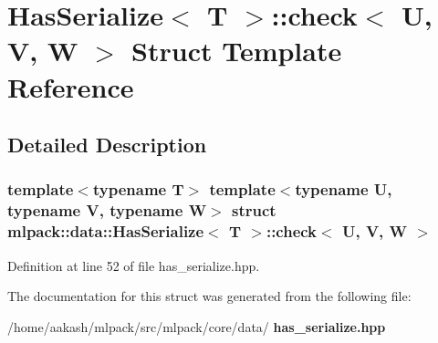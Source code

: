 \section{Has\+Serialize$<$ T $>$\+:\+:check$<$ U, V, W $>$ Struct Template Reference}
\label{structmlpack_1_1data_1_1HasSerialize_1_1check}


\subsection{Detailed Description}
\subsubsection*{template$<$typename T$>$\newline
template$<$typename U, typename V, typename W$>$\newline
struct mlpack\+::data\+::\+Has\+Serialize$<$ T $>$\+::check$<$ U, V, W $>$}



Definition at line 52 of file has\+\_\+serialize.\+hpp.



The documentation for this struct was generated from the following file\+:\begin{DoxyCompactItemize}
\item 
/home/aakash/mlpack/src/mlpack/core/data/\textbf{ has\+\_\+serialize.\+hpp}\end{DoxyCompactItemize}

